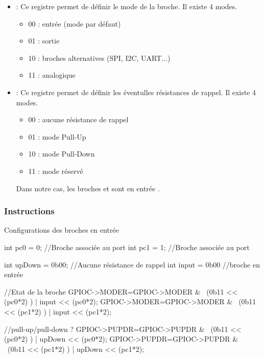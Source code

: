 \begin{itemize}

\item {} : Ce registre permet de définir le mode de la broche. Il existe 4 modes.

  \begin{itemize}
    \item 00 : entrée  (mode par défaut)
    \item 01 : sortie
    \item 10 : broches alternatives (SPI, I2C, UART...)
    \item 11 : analogique
  \end{itemize}

 \item {} : Ce registre permet de définir les éventulles résistances de rappel. Il existe 4 modes.

  \begin{itemize}
    \item 00 : aucune résistance de rappel
    \item 01 : mode Pull-Up
    \item 10 : mode Pull-Down
    \item 11 : mode réservé
  \end{itemize}

  Dans notre cas, les broches  et  sont en entrée .

\end{itemize}

\subsubsection{Instructions}

  \begin{Cpp}{Configurations des broches en entrée}

  int pc0 = 0;                //Broche associée au port
  int pc1 = 1;                //Broche associée au port

  int upDown = 0b00;   //Aucune résistance de rappel
  int input = 0b00     //broche en entrée

  //Etat de la broche
  GPIOC->MODER=GPIOC->MODER & ~(0b11 << (pc0*2) ) | input << (pc0*2); 
  GPIOC->MODER=GPIOC->MODER & ~(0b11 << (pc1*2) ) | input << (pc1*2);

  //pull-up/pull-down ?
  GPIOC->PUPDR=GPIOC->PUPDR & ~(0b11 << (pc0*2) ) | upDown << (pc0*2);
  GPIOC->PUPDR=GPIOC->PUPDR & ~(0b11 << (pc1*2) ) | upDown << (pc1*2);

\end{Cpp}

